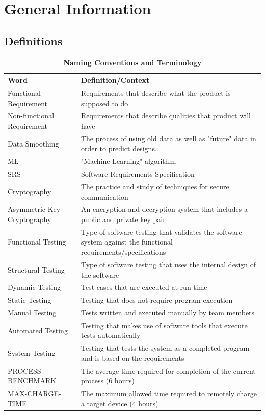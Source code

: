 \documentclass[12pt, titlepage]{article}
\begin{document}
\section{General Information}
\subsection{Definitions}
\begin{table}[H]
\caption{\bf Naming Conventions and Terminology}
\begin{tabular}{ |p{6cm}|p{8cm}|  } 
 \hline
\bf Word & \bf Definition/Context\\
 \hline
 Functional Requirement & Requirements that describe what the product is supposed to do\\
 \hline
Non-functional Requirement & Requirements that describe qualities that product will have\\
\hline
Data Smoothing & The process of using old data as well as "future" data in order to predict designs.\\
\hline
ML & "Machine Learning" algorithm.\\
\hline
SRS & Software Requirements Specification\\
\hline
Cryptography & The practice and study of techniques for secure communication\\
\hline
Asymmetric Key Cryptography & An encryption and decryption system that includes a public and private key pair\\
\hline
Functional Testing & Type of software testing that validates the software system against the functional requirements/specifications\\
\hline
Structural Testing & Type of software testing that uses the internal design of the software\\
\hline
Dynamic Testing & Test cases that are executed at run-time\\
\hline
Static Testing & Testing that does not require program execution\\
\hline
Manual Testing & Tests written and executed manually by team members\\
\hline
Automated Testing & Testing that makes use of software tools that execute tests automatically\\
\hline
System Testing & Testing that tests the system as a completed program and is based on the requirements\\
\hline
PROCESS-BENCHMARK & The average time required for completion of the current process (6 hours)\\
\hline
MAX-CHARGE-TIME & The maximum allowed time required to remotely charge a target device (4 hours)\\
\hline
\end{tabular}
\end{table}
\end{document}
